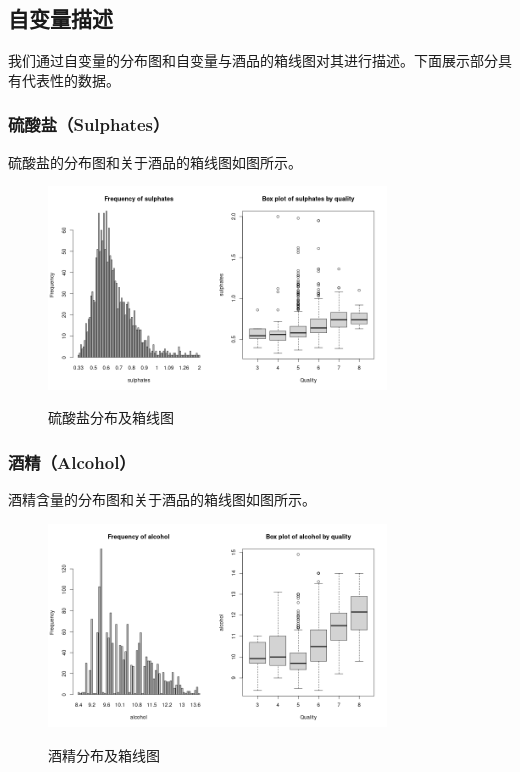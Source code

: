 \documentclass[fontset=ubuntu]{ctexart}
\begin{document}
        \subsection{自变量描述}
            我们通过自变量的分布图和自变量与酒品的箱线图对其进行描述。下面展示部分具有代表性的数据。
            \clearpage
            \subsubsection{硫酸盐（Sulphates）}
                硫酸盐的分布图和关于酒品的箱线图如图所示。
                \begin{figure}[htbp]
                    \centering
                    \includegraphics[width=0.8\textwidth]{../figures/sulphates-plot.png}
                    \label{fig:sulphates}
                    \caption{硫酸盐分布及箱线图}
                \end{figure}

            \subsubsection{酒精（Alcohol）}
                酒精含量的分布图和关于酒品的箱线图如图所示。
                \begin{figure}[htbp]
                    \centering
                    \includegraphics[width=0.8\textwidth]{../figures/alcohol-plot.png}
                    \label{fig:alcohol}
                    \caption{酒精分布及箱线图}
                \end{figure}
            
\end{document}
